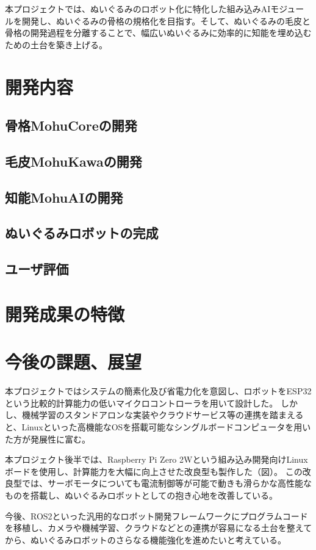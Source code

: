 \documentclass[uplatex,a4paper,12pt]{jsarticle}
\begin{document}
本プロジェクトでは、ぬいぐるみのロボット化に特化した組み込みAIモジュールを開発し、ぬいぐるみの骨格の規格化を目指す。そして、ぬいぐるみの毛皮と骨格の開発過程を分離することで、幅広いぬいぐるみに効率的に知能を埋め込むための土台を築き上げる。

\section{開発内容}
\subsection{骨格MohuCoreの開発}
\subsection{毛皮MohuKawaの開発}
\subsection{知能MohuAIの開発}
\subsection{ぬいぐるみロボットの完成}
\subsection{ユーザ評価}

\section{開発成果の特徴}

\section{今後の課題、展望}
本プロジェクトではシステムの簡素化及び省電力化を意図し、ロボットをESP32という比較的計算能力の低いマイクロコントローラを用いて設計した。
しかし、機械学習のスタンドアロンな実装やクラウドサービス等の連携を踏まえると、Linuxといった高機能なOSを搭載可能なシングルボードコンピュータを用いた方が発展性に富む。

本プロジェクト後半では、Raspberry Pi Zero 2Wという組み込み開発向けLinuxボードを使用し、計算能力を大幅に向上させた改良型も製作した（図）。
この改良型では、サーボモータについても電流制御等が可能で動きも滑らかな高性能なものを搭載し、ぬいぐるみロボットとしての抱き心地を改善している。

今後、ROS2といった汎用的なロボット開発フレームワークにプログラムコードを移植し、カメラや機械学習、クラウドなどとの連携が容易になる土台を整えてから、ぬいぐるみロボットのさらなる機能強化を進めたいと考えている。
\end{document}
